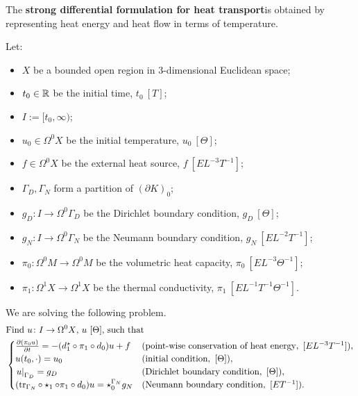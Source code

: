 \begin{formulation}
  \label{idec/continuous_heat_transport/strong-formulation}
  The \textbf{strong differential formulation for heat transport}is obtained by
  representing heat energy and heat flow in terms of temperature.

  Let:
  \begin{itemize}
    \item
      $X$ be a bounded open region in $3$-dimensional Euclidean space;
    \item
      $t_0 \in \mathbb{R}$ be the initial time, $t_0\ [T]$;
    \item
      $I := [t_0, \infty)$;
    \item
      $u_0 \in \Omega^0 X$ be the initial temperature, $u_0\ [\Theta]$;
    \item
      $f \in \Omega^0 X$ be the external heat source, $f\ [E L^{-3} T^{-1}]$;
    \item
      $\Gamma_D, \Gamma_N$ form a partition of $(\partial K)_0$;
    \item
      $g_D \colon I \to \Omega^0 \Gamma_D$
      be the Dirichlet boundary condition, $g_D\ [\Theta]$;
    \item
      $g_N \colon I \to \Omega^0 \Gamma_N$
      be the Neumann boundary condition, $g_N\ [E L^{-2} T^{-1}]$;
    \item
      $\pi_0 \colon \Omega^0 M \to \Omega^0 M$ be the volumetric heat capacity,
      $\pi_0\ [E L^{-3} \Theta^{-1}]$;
    \item
      $\pi_1 \colon \Omega^1 X \to \Omega^1 X$ be the thermal conductivity,
      $\pi_1\ [E L^{-1} T^{-1} \Theta^{-1}]$.
  \end{itemize}
  We are solving the following problem.
  \begin{equation}
    \begin{split}
      & \text{Find $u \colon I \to \Omega^0 X$, $u\ [\Theta]$, such that} \\
      &
      \begin{cases}
        \frac{\partial (\pi_0 u)}{\partial t} =
        - (d_1^\star \circ \pi_1 \circ d_0) u + f
        & (\text{point-wise conservation of heat energy},
          \ [E L^{-3} T^{-1}]), \\
%
        u(t_0, \cdot) = u_0
        & (\text{initial condition},\ [\Theta]), \\
%
        \restrict{u}{\Gamma_D} = g_D
        & (\text{Dirichlet boundary condition},\ [\Theta]), \\
%
        (\tr_{\Gamma_N} \circ \star_1\circ \pi_1 \circ d_0) u
        = \star^{\Gamma_N}_0 g_N
        & (\text{Neumann boundary condition},\ [E T^{-1}]).
      \end{cases}
    \end{split}
  \end{equation}
\end{formulation}

